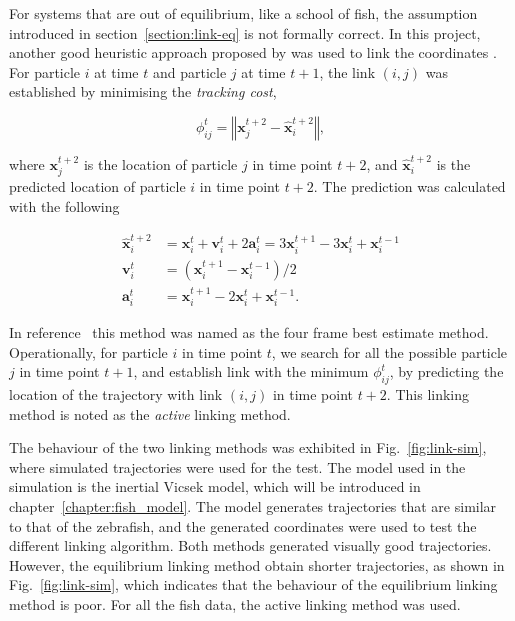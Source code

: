 \documentclass[11pt,twoside]{report}
\begin{document}
For systems that are out of equilibrium, like a school of fish, the assumption introduced in section~\ref{section:link-eq} is not formally correct. In this project, another good heuristic approach proposed by \citeauthor{ouellette2005ef} was used to link the coordinates \cite{ouellette2005ef}.
For particle $i$ at time $t$ and particle $j$ at time $t+1$, the link $(i, j)$ was established by minimising the \emph{tracking cost},

$$
\phi_{ij}^{t} = \left\Vert
\mathbf{x}_j^{t+2} - \hat{\mathbf{x}}_i^{t+2}
\right\Vert,
$$

\noindent where $\mathbf{x}_j^{t+2}$ is the location of particle $j$ in time point $t + 2$, and $\hat{\mathbf{x}}_i^{t+2}$ is the predicted location of particle $i$ in time point $t + 2$. The prediction was calculated with the following

$$
\begin{aligned}
\hat{\mathbf{x}}_i^{t + 2} &= 
\mathbf{x}_i^t + 
\mathbf{v}_i^t + 
2 \mathbf{a}_i^t = 
3 \mathbf{x}_i^{t+1} - 
3 \mathbf{x}_i^t +
\mathbf{x}_i^{t-1} \\
\mathbf{v}_i^t &= (\mathbf{x}_i^{t+1} - \mathbf{x}_i^{t - 1}) / 2 \\
\mathbf{a}_i^t &= 
\mathbf{x}_i^{t+1} - 2 \mathbf{x}_i^{t} + \mathbf{x}_i^{t-1}.
\end{aligned}
$$

\noindent In reference~\cite{ouellette2005ef} this method was named as the four frame best estimate method. Operationally, for particle $i$ in time point $t$, we search for all the possible particle $j$ in time point $t+1$, and establish link with the minimum $\phi_{ij}^t$, by predicting the location of the trajectory with link $(i, j)$ in time point $t + 2$. This linking method is noted as the \emph{active} linking method.

The behaviour of the two linking methods was exhibited in Fig.~\ref{fig:link-sim}, where simulated trajectories were used for the test. The model used in the simulation is the inertial Vicsek model, which will be introduced in chapter~\ref{chapter:fish_model}. The model generates trajectories that are similar to that of the zebrafish, and the generated coordinates were used to test the different linking algorithm.
Both methods generated visually good trajectories.
However, the equilibrium linking method obtain shorter trajectories, as shown in Fig.~\ref{fig:link-sim}, which indicates that the behaviour of the equilibrium linking method is poor. For all the fish data, the active linking method was used.
\end{document}
